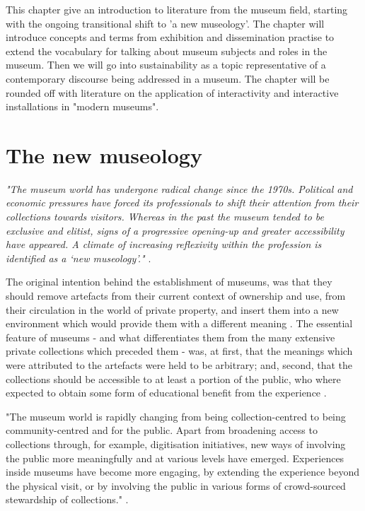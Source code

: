 
This chapter give an introduction to literature from the museum field, starting with the ongoing transitional shift to 'a new museology'. The chapter will introduce concepts and terms from exhibition and dissemination practise to extend the vocabulary for talking about museum subjects and roles in the museum. Then we will go into sustainability as a topic representative of a contemporary discourse being addressed in a museum. The chapter will be rounded off with literature on the application of interactivity and interactive installations in "modern museums".

\section{The new museology}

\emph{"The museum world has undergone radical change since the 1970s.  Political and economic pressures have forced its professionals to shift their attention from their collections towards visitors. Whereas in the past the museum tended to be exclusive and elitist, signs of a progressive opening-up and greater accessibility have appeared. A climate of increasing reflexivity within the profession is identified as a ‘new museology’."} \autocite[p. 84]{ross_interpreting_2015}.

The original intention behind the establishment of museums, was that they should remove artefacts from their current context of ownership and use, from their circulation in the world of private property, and insert them into a new environment which would provide them with a different meaning \autocite[p. 6]{vergo_museology_1989}. The essential feature of museums - and what differentiates them from the many extensive private collections which preceded them - was, at first, that the meanings which were attributed to the artefacts were held to be arbitrary; and, second, that the collections should be accessible to at least a portion of the public, who where expected to obtain some form of educational benefit from the experience \autocite[p. 6]{vergo_museology_1989}.

"The museum world is rapidly changing from being collection-centred to being community-centred and for the public. Apart from broadening access to collections through, for example, digitisation initiatives, new ways of involving the public more meaningfully and at various levels have emerged. Experiences inside museums have become more engaging, by extending the experience beyond the physical visit, or by involving the public in various forms of crowd-sourced stewardship of collections." \autocite[abstract]{vermeeren_museum_2018}.

